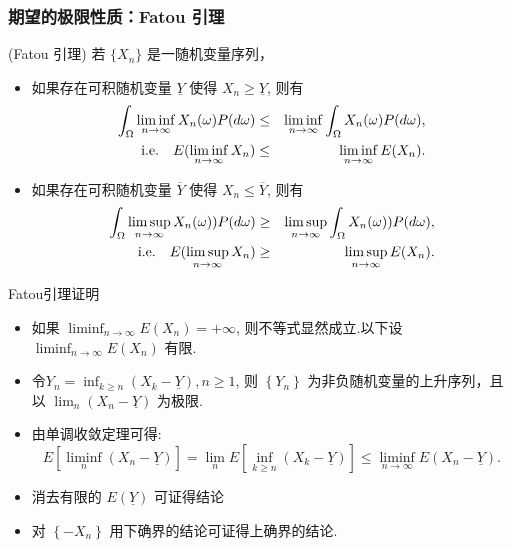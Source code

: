 	\begin{frame}
		\frametitle{期望的极限性质：Fatou 引理}
		\begin{thm}
			(Fatou 引理) 若 $\{X_n\}$ 是一随机变量序列，
			\begin{itemize}
				\item 如果存在可积随机变量 $\underline{Y}$ 使得 $X_n\geq \underline{Y}$, 则有 \begin{eqnarray*}
					\int_{\Omega}\liminf_{n\rightarrow\infty}X_n(\omega)P(d\omega)&\leq& \liminf_{n\rightarrow\infty}\int_\Omega X_n(\omega)P(d\omega),  \\
					{\rm i.e. }\quad  E(\liminf_{n\rightarrow\infty}X_n)&\leq& \liminf_{n\rightarrow\infty}E(X_n).                                                                                           \end{eqnarray*}
				\item 如果存在可积随机变量 $\overline{Y}$ 使得 $X_n\leq \overline{Y}$, 则有 \begin{eqnarray*}                                                                                                          \int_{\Omega}\limsup_{n\rightarrow\infty} X_n (\omega)) P (d\omega)&\geq& \limsup_{n\rightarrow\infty}\int_\Omega X_n (\omega)) P (d\omega), \\
					{\rm i.e.} \quad    E(\limsup_{n\rightarrow\infty}X_n)&\geq& \limsup_{n\rightarrow\infty}E(X_n).                                                                                           \end{eqnarray*} \end{itemize}
		\end{thm}

	\end{frame}
\begin{frame}{Fatou引理证明}
	\begin{itemize}[<+-|alert@+>]
		\item 如果 $\liminf_{n\rightarrow\infty}E\left(X_n\right)=+\infty$, 则不等式显然成立.以下设 $\liminf_{n\rightarrow\infty}E\left(X_n\right)$ 有限.
		\item 令$Y_{n}=\inf_{k\geq n}\left(X_{k}-\underline{Y}\right),  n \geq 1$,	则 $\left\{Y_{n}\right\}$ 为非负随机变量的上升序列，且以 $\lim_n\left(X_n-\underline{Y}\right)$ 为极限.
		\item 由单调收敛定理可得: %
		\[
		E\left[\liminf_{n}\left(X_n-\underline{Y}\right)\right]=\lim _{n} E\left[\inf_{k\geq n}\left(X_{k}-\underline{Y}\right)\right] \leq \liminf_{n\rightarrow\infty}E\left(X_n-\underline{Y}\right) .
		\]
		\item 消去有限的 $E(\underline{Y})$ 可证得结论
		\item 对 $\left\{-X_n\right\}$ 用下确界的结论可证得上确界的结论.%
	\end{itemize}

\end{frame}


